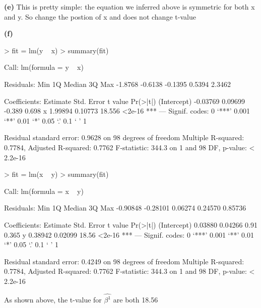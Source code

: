 \documentclass[a4paper]{article}
\renewcommand{\part}[1] {\vspace{.10in} {\bf (#1)}}
\begin{document}
\part{e}
{\color{red}
This is pretty simple: the equation we inferred above is symmetric for both x and y. So change the postion of x and does not change t-value}

\part{f}
\begin{Schunk}
\begin{Sinput}
> fit = lm(y ~ x)
> summary(fit)
\end{Sinput}
\begin{Soutput}
Call:
lm(formula = y ~ x)

Residuals:
    Min      1Q  Median      3Q     Max 
-1.8768 -0.6138 -0.1395  0.5394  2.3462 

Coefficients:
            Estimate Std. Error t value Pr(>|t|)    
(Intercept) -0.03769    0.09699  -0.389    0.698    
x            1.99894    0.10773  18.556   <2e-16 ***
---
Signif. codes:  0 ‘***’ 0.001 ‘**’ 0.01 ‘*’ 0.05 ‘.’ 0.1 ‘ ’ 1

Residual standard error: 0.9628 on 98 degrees of freedom
Multiple R-squared:  0.7784,	Adjusted R-squared:  0.7762 
F-statistic: 344.3 on 1 and 98 DF,  p-value: < 2.2e-16
\end{Soutput}
\begin{Sinput}
> fit = lm(x ~ y)
> summary(fit)
\end{Sinput}
\begin{Soutput}
Call:
lm(formula = x ~ y)

Residuals:
     Min       1Q   Median       3Q      Max 
-0.90848 -0.28101  0.06274  0.24570  0.85736 

Coefficients:
            Estimate Std. Error t value Pr(>|t|)    
(Intercept)  0.03880    0.04266    0.91    0.365    
y            0.38942    0.02099   18.56   <2e-16 ***
---
Signif. codes:  0 ‘***’ 0.001 ‘**’ 0.01 ‘*’ 0.05 ‘.’ 0.1 ‘ ’ 1

Residual standard error: 0.4249 on 98 degrees of freedom
Multiple R-squared:  0.7784,	Adjusted R-squared:  0.7762 
F-statistic: 344.3 on 1 and 98 DF,  p-value: < 2.2e-16
\end{Soutput}
\end{Schunk}

{\color{red}
As shown above, the t-value for $\hat{\beta^1}$ are both 18.56

}
\end{document}
